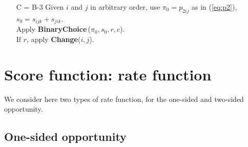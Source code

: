 \documentclass[a4paper,12pt,fleqn]{article}
\makeatletter
\newenvironment{frindent}[3]
{\par \setlength{\leftmargin}{#1}       \setlength{\rightmargin}{#2}
  \advance\linewidth - \leftmargin       \advance\linewidth -\rightmargin
  \advance\linewidth - #3
  \advance\@totalleftmargin\leftmargin  \@setpar{{\@@par}}%
  \parshape 1 \@totalleftmargin         \linewidth \ignorespaces
  \begin{minipage}[h]{\linewidth}\begin{framed}}{\end{framed}\end{minipage}\par}
\makeatother
\begin{document}
\begin{itemize}
                 Another implementation, which integrates out over the double choice
                 and therefore has a less variable score function
                 and is preferable:\\
                 If $x_{ij} = 0$:
                 \begin{frindent}{2em}{1em}{6em}
                 Use $\pi_0 = p_{0ij}\,p_{0ji}$,
                 \[
                 s_0 = \frac{\big(1-p_{0ij}(x, \beta)\big)\, s_{ijk} + \big(1-p_{0ji}(x, \beta)\big)\, s_{jik}}
                             {1 - p_{0ij}(x, \beta)\,p_{0ji}(x, \beta)} \ ;
                 \]
                 Apply \textbf{BinaryChoice}\,($\pi_0,s_0,r,c$);\\
                 If $r$, apply \textbf{Change}($i,j$).
                 \end{frindent}
                 If $x_{ij} = 1$:
                 \begin{frindent}{2em}{1em}{6em}
                 Use $\pi_0 = 1 - \big(1 - p_{0ij}\big)\big(1-p_{0ji}\big) = p_{0ij} + p_{0ji} - p_{0ij}p_{0ji}$,
                 \[
                 s_0 = \frac{p_{0ij}(x, \beta)\, s_{ijk} + p_{0ji}(x, \beta)\, s_{jik}}
                             { p_{0ij}(x, \beta) + p_{0ji}(x, \beta) -  p_{0ij}(x, \beta) p_{0ji}(x, \beta)} \ ;
                 \]
                 Apply \textbf{BinaryChoice}\,($\pi_0,s_0,r,c$);\\
                 If $r$, apply \textbf{Change}($i,j$).
                 \end{frindent}
\item[C = B-3] Given $i$ and $j$ in arbitrary order,
                 use $\pi_0 = p_{2ij}$ as in (\ref{eq:p2}), $s_0 = s_{ijk} + s_{jik}$.\\
                 Apply \textbf{BinaryChoice}\,($\pi_0,s_0,r,c$).\\
                 If $r$, apply \textbf{Change}($i,j$).
\end{itemize}



\section{Score function: rate function}
We consider here two types of rate function, for the one-sided and
two-sided opportunity.

\subsection{One-sided opportunity}
 \label{S_14.1}
\end{document}
